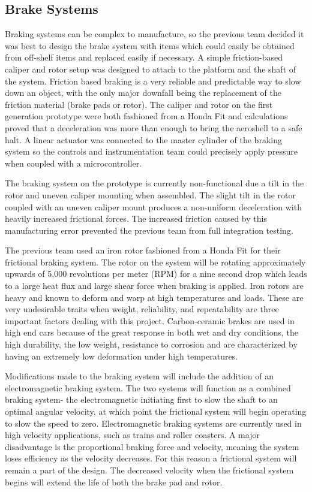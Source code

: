 \subsection{Brake Systems}

\indent\indent Braking systems can be complex to manufacture, so the previous team decided it was best to design the brake system with items which could easily be obtained from off-shelf items and replaced easily if necessary. A simple friction-based caliper and rotor setup was designed to attach to the platform and the shaft of the system. Friction based braking is a very reliable and predictable way to slow down an object, with the only major downfall being the replacement of the friction material (brake pads or rotor). The caliper and rotor on the first generation prototype were both fashioned from a Honda Fit and calculations proved that a deceleration was more than enough to bring the aeroshell to a safe halt. A linear actuator was connected to the master cylinder of the braking system so the controls and instrumentation team could precisely apply pressure when coupled with a microcontroller.

\indent The braking system on the prototype is currently non-functional due a tilt in the rotor and uneven caliper mounting when assembled. The slight tilt in the rotor coupled with an uneven caliper mount produces a non-uniform deceleration with heavily increased frictional forces. The increased friction caused by this manufacturing error prevented the previous team from full integration testing.

\indent The previous team used an iron rotor fashioned from a Honda Fit for their frictional braking system. The rotor on the system will be rotating approximately upwards of 5,000 revolutions per meter (RPM) for a nine second drop which leads to a large heat flux and large shear force when braking is applied. Iron rotors are heavy and known to deform and warp at high temperatures and loads. These are very undesirable traits when weight, reliability, and repeatability are three important factors dealing with this project. Carbon-ceramic brakes are used in high end cars because of the great response in both wet and dry conditions, the high durability, the low weight, resistance to corrosion and are characterized by having an extremely low deformation under high temperatures.

\indent Modifications made to the braking system will include the addition of an electromagnetic braking system. The two systems will function as a combined braking system- the electromagnetic initiating first to slow the shaft to an optimal angular velocity, at which point the frictional system will begin operating to slow the speed to zero. Electromagnetic braking systems are currently used in high velocity applications, such as trains and roller coasters. A major disadvantage is the proportional braking force and velocity, meaning the system loses efficiency as the velocity decreases. For this reason a frictional system will remain a part of the design. The decreased velocity when the frictional system begins will extend the life of both the brake pad and rotor.

